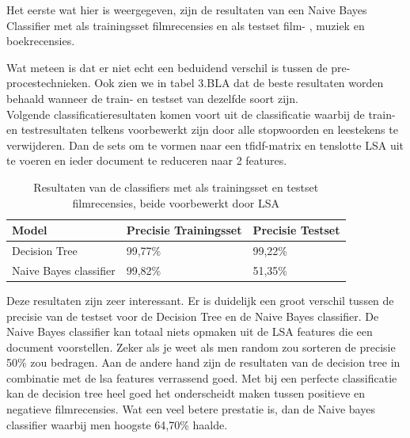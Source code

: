 Het eerste wat hier is weergegeven, zijn de resultaten van een Naive Bayes Classifier met als trainingsset filmrecensies en als testset film- , muziek en boekrecensies. 


Wat meteen is dat er niet echt een beduidend verschil is tussen de pre-procestechnieken. Ook zien we in tabel 3.BLA dat de beste resultaten worden behaald wanneer de train- en testset van dezelfde soort zijn. \\

Volgende classificatieresultaten komen voort uit de classificatie waarbij de train- en testresultaten telkens voorbewerkt zijn door alle stopwoorden en leestekens te verwijderen. Dan de sets om te vormen naar een tfidf-matrix en tenslotte LSA uit te voeren en ieder document te reduceren naar 2 features.
%
\begin{table}[h]
\centering
\begin{tabular}{|l|l|l|}
\hline
\textbf{Model}              &\textbf{Precisie Trainingsset}    &\textbf{Precisie Testset}    \\   \hline
Decision Tree               & 99,77\%                          & 99,22\%                     \\  \hline
Naive Bayes classifier      & 99,82\%                          & 51,35\%                     \\ \hline 
\end{tabular}
\caption{Resultaten van de classifiers met als trainingsset en testset filmrecensies, beide voorbewerkt door LSA }
\end{table}

Deze resultaten zijn zeer interessant. Er is duidelijk een groot verschil tussen de precisie van de testset voor de Decision Tree en de Naive Bayes classifier. De Naive Bayes classifier kan totaal niets opmaken uit de LSA features die een document voorstellen. Zeker als je weet als men random zou sorteren de precisie 50\%  zou bedragen. Aan de andere hand zijn de resultaten van de decision tree in combinatie met de  lsa features verrassend goed. Met bij een perfecte classificatie kan de decision tree heel goed het onderscheidt maken tussen positieve en negatieve filmrecensies. Wat een veel betere prestatie is, dan de Naive bayes classifier waarbij men hoogste 64,70\% haalde.

